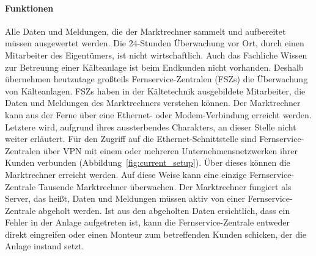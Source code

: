 \documentclass[11pt,a4paper]{report}
\begin{document}
\paragraph{Funktionen} \label{para:architektur}

Alle Daten und Meldungen, die der Marktrechner sammelt und aufbereitet müssen ausgewertet werden. Die 24-Stunden Überwachung vor Ort, durch einen Mitarbeiter des Eigentümers, ist nicht wirtschaftlich. Auch das Fachliche Wissen zur Betreuung einer Kälteanlage ist beim Endkunden nicht vorhanden. Deshalb übernehmen heutzutage großteils Fernservice-Zentralen (FSZs) die Überwachung von Kälteanlagen. FSZs haben in der Kältetechnik ausgebildete Mitarbeiter, die Daten und Meldungen des Marktrechners verstehen können. Der Marktrechner kann aus der Ferne über eine Ethernet- oder Modem-Verbindung erreicht werden. Letztere wird, aufgrund ihres aussterbendes Charakters, an dieser Stelle nicht weiter erläutert. Für den Zugriff auf die Ethernet-Schnittstelle sind Fernservice-Zentralen über VPN mit einem oder mehreren Unternehmensnetzwerken ihrer Kunden verbunden (Abbildung~\ref{fig:current_setup}). Über dieses können die Marktrechner erreicht werden. Auf diese Weise kann eine einzige Fernservice-Zentrale Tausende Marktrechner überwachen. Der Marktrechner fungiert als Server, das heißt, Daten und Meldungen müssen aktiv von einer Fernservice-Zentrale abgeholt werden. Ist aus den abgeholten Daten ersichtlich, dass ein Fehler in der Anlage aufgetreten ist, kann die Fernservice-Zentrale entweder direkt eingreifen oder einen Monteur zum betreffenden Kunden schicken, der die Anlage instand setzt.

\end{document}

